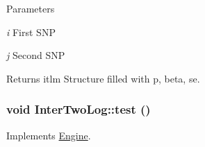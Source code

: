 \begin{DoxyParams}{Parameters}
\item[{\em i}]First SNP \item[{\em j}]Second SNP \end{DoxyParams}
\begin{DoxyReturn}{Returns}
itlm Structure filled with p, beta, se. 
\end{DoxyReturn}
\hypertarget{classInterTwoLog_a525b88900b11ed13cdefd73f5024e2eb}{
\subsubsection[{test}]{\setlength{\rightskip}{0pt plus 5cm}void InterTwoLog::test ()}}
\label{classInterTwoLog_a525b88900b11ed13cdefd73f5024e2eb}


Implements \hyperlink{classEngine_a2927c4a4263809453063ad482c6434a4}{Engine}.



